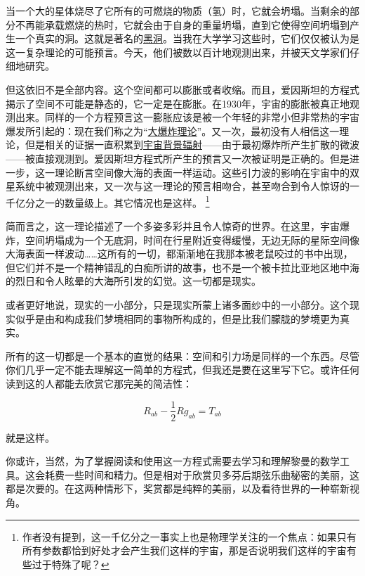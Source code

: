     当一个大的星体烧尽了它所有的可燃烧的物质（氢）时，它就会坍塌。当剩余的部分不再能承载燃烧的热时，它就会由于自身的重量坍塌，直到它使得空间坍塌到产生一个真实的洞。这就是著名的\href{http://toyhouse.cc/wiki/index.php/黑洞}{黑洞}。当我在大学学习这些时，它们仅仅被认为是这一复杂理论的可能预言。今天，他们被数以百计地观测出来，并被天文学家们仔细地研究。

    但这依旧不是全部内容。这个空间都可以膨胀或者收缩。而且，爱因斯坦的方程式揭示了空间不可能是静态的，它一定是在膨胀。在1930年，宇宙的膨胀被真正地观测出来。同样的一个方程预言这一膨胀应该是被一个年轻的非常小但非常热的宇宙爆发所引起的：现在我们称之为“\href{https://en.wikipedia.org/wiki/Big Bang}{大爆炸理论}”。又一次，最初没有人相信这一理论，但是相关的证据一直积累到\href{http://toyhouse.cc/wiki/index.php/宇宙背景辐射}{宇宙背景辐射}——由于最初爆炸所产生扩散的微波——被直接观测到。爱因斯坦方程式所产生的预言又一次被证明是正确的。但是进一步，这一理论断言空间像大海的表面一样运动。这些引力波的影响在宇宙中的双星系统中被观测出来，又一次与这一理论的预言相吻合，甚至吻合到令人惊讶的一千亿分之一的数量级上。其它情况也是这样。
\footnote[5]
{
作者没有提到，这一千亿分之一事实上也是物理学关注的一个焦点：如果只有所有参数都恰到好处才会产生我们这样的宇宙，那是否说明我们这样的宇宙有些过于特殊了呢？
}

    简而言之，这一理论描述了一个多姿多彩并且令人惊奇的世界。在这里，宇宙爆炸，空间坍塌成为一个无底洞，时间在行星附近变得缓慢，无边无际的星际空间像大海表面一样波动……这所有的一切，都渐渐地在我那本被老鼠咬过的书中出现，但它们并不是一个精神错乱的白痴所讲的故事，也不是一个被卡拉比亚地区地中海的烈日和令人眩晕的大海所引发的幻觉。这一切都是现实。

    或者更好地说，现实的一小部分，只是现实所蒙上诸多面纱中的一小部分。这个现实似乎是由和构成我们梦境相同的事物所构成的，但是比我们朦胧的梦境更为真实。

    所有的这一切都是一个基本的直觉的结果：空间和引力场是同样的一个东西。尽管你们几乎一定不能去理解这一简单的方程式，但我还是要在这里写下它。或许任何读到这的人都能去欣赏它那完美的简洁性：
    
$$R_{ab}-\frac{1}{2}Rg_{ab}=T_{ab}$$                      

    就是这样。

    你或许，当然，为了掌握阅读和使用这一方程式需要去学习和理解黎曼的数学工具。这会耗费一些时间和精力。但是相对于欣赏贝多芬后期弦乐曲秘密的美丽，这都是次要的。在这两种情形下，奖赏都是纯粹的美丽，以及看待世界的一种崭新视角。




